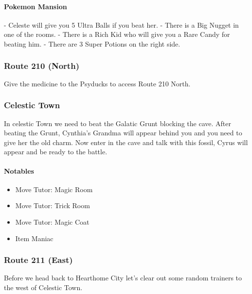 \documentclass[11pt]{article}
\begin{document}
\paragraph{Pokemon Mansion}
- Celeste will give you 5 Ultra Balls if you beat her.
- There is a Big Nugget in one of the rooms.
- There is a Rich Kid who will give you a Rare Candy for beating him.
- There are 3 Super Potions on the right side.





\subsubsection{Route 210 (North)}\label{subsubsec:route-210-(north)}
Give the medicine to the Psyducks to access Route 210 North.

\subsubsection{Celestic Town}\label{subsubsec:celestic-town}
In celestic Town we need to beat the Galatic Grunt blocking the cave.
After beating the Grunt, Cynthia's Grandma will appear behind you
and you need to give her the old charm.
Now enter in the cave and talk with this fossil, Cyrus will appear and be ready to the battle.

\paragraph{Notables}\label{par:notables-celestic}

\begin{itemize}
    \item Move Tutor: Magic Room
    \item Move Tutor: Trick Room
    \item Move Tutor: Magic Coat
    \item Item Maniac
\end{itemize}

\subsubsection{Route 211 (East)}\label{subsubsec:route_211_(east)}
Before we head back to Hearthome City let's clear out some random trainers to
the west of Celestic Town.

% 

\end{document}
